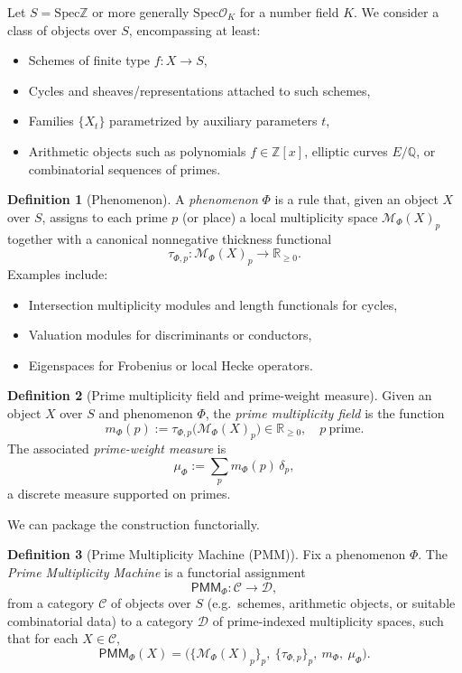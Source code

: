 \documentclass[11pt]{article}
\theoremstyle{definition}
\newtheorem{definition}{Definition}[section]
\theoremstyle{plain}
\theoremstyle{remark}
\newcommand{\Spec}{\mathrm{Spec}}
\newcommand{\ZZ}{\mathbb{Z}}
\newcommand{\QQ}{\mathbb{Q}}
\newcommand{\RR}{\mathbb{R}}
\newcommand{\1}{\mathbb{1}}
\begin{document}
Let \(S = \Spec \ZZ\) or more generally \(\Spec \mathcal{O}_K\) for a number field \(K\). We consider a class of objects over \(S\), encompassing at least:

\begin{itemize}[leftmargin=*]
  \item Schemes of finite type \(f: X \to S\),
  \item Cycles and sheaves/representations attached to such schemes,
  \item Families \(\{X_t\}\) parametrized by auxiliary parameters \(t\),
  \item Arithmetic objects such as polynomials \(f\in \ZZ[x]\), elliptic curves \(E/\QQ\), or combinatorial sequences of primes.
\end{itemize}

\begin{definition}[Phenomenon]
A \emph{phenomenon} \(\Phi\) is a rule that, given an object \(X\) over \(S\), assigns to each prime \(p\) (or place) a local multiplicity space \(\mathcal{M}_\Phi(X)_p\) together with a canonical nonnegative thickness functional
\[
  \tau_{\Phi,p}\colon \mathcal{M}_\Phi(X)_p \to \RR_{\ge 0}.
\]
Examples include:
\begin{itemize}[leftmargin=*]
  \item Intersection multiplicity modules and length functionals for cycles,
  \item Valuation modules for discriminants or conductors,
  \item Eigenspaces for Frobenius or local Hecke operators.
\end{itemize}
\end{definition}

\begin{definition}[Prime multiplicity field and prime-weight measure]
Given an object \(X\) over \(S\) and phenomenon \(\Phi\), the \emph{prime multiplicity field} is the function
\[
  m_\Phi(p) := \tau_{\Phi,p}\big(\mathcal{M}_\Phi(X)_p\big) \in \RR_{\ge 0},\quad p\ \text{prime}.
\]
The associated \emph{prime-weight measure} is
\[
  \mu_\Phi := \sum_p m_\Phi(p)\,\delta_p,
\]
a discrete measure supported on primes.
\end{definition}

We can package the construction functorially.

\begin{definition}[Prime Multiplicity Machine (PMM)]
Fix a phenomenon \(\Phi\). The \emph{Prime Multiplicity Machine} is a functorial assignment
\[
  \mathsf{PMM}_\Phi\colon \mathcal{C} \to \mathcal{D},
\]
from a category \(\mathcal{C}\) of objects over \(S\) (e.g.\ schemes, arithmetic objects, or suitable combinatorial data) to a category \(\mathcal{D}\) of prime-indexed multiplicity spaces, such that for each \(X\in\mathcal{C}\),
\[
  \mathsf{PMM}_\Phi(X) = \Big( \{\mathcal{M}_\Phi(X)_p\}_p,\ \{\tau_{\Phi,p}\}_p,\ m_\Phi,\ \mu_\Phi \Big).
\]
\end{definition}
\end{document}
